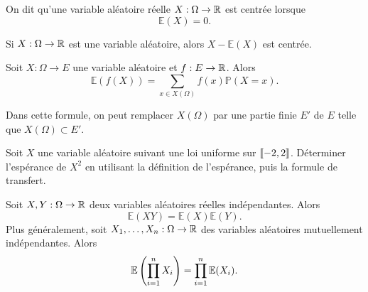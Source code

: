 \documentclass{magnolia}
\begin{document}
\begin{definition}
On dit qu'une variable aléatoire réelle $X:\Omega\to\mathbb{R}$ est centrée lorsque
\[\mathbb{E}(X)=0.\]
\end{definition}

\begin{remarqueUnique}
\remarque Si $X:\Omega\to\mathbb{R}$ est une variable aléatoire, alors $X-\mathbb{E}(X)$ est
  centrée.
\end{remarqueUnique}

\begin{proposition}[nom={Formule de transfert}]
Soit $X:\Omega\to E$ une variable aléatoire et $f:E\to\mathbb{R}$. Alors
\[\mathbb{E}(f(X))=\sum_{x\in X(\Omega)} f(x) \mathbb{P}(X=x).\]
\end{proposition}

\begin{remarqueUnique}
\remarque Dans cette formule, on peut remplacer $X(\Omega)$ par une partie finie $E'$ de $E$ telle que
  $X(\Omega)\subset E'$. 
\end{remarqueUnique}

\begin{exoUnique}
\exo Soit $X$ une variable aléatoire suivant une loi uniforme sur $\left\llbracket -2,2\right\rrbracket$. Déterminer
  l'espérance de $X^2$ en utilisant la définition de l'espérance, puis la formule de
  transfert.
\end{exoUnique}

\begin{proposition}
Soit $X,Y:\Omega\to\mathbb{R}$ deux variables aléatoires réelles indépendantes. Alors
\[\mathbb{E}(XY)=\mathbb{E}(X)\mathbb{E}(Y).\]
Plus généralement, soit $X_1,\ldots,X_n:\Omega\to\mathbb{R}$ des variables aléatoires mutuellement
indépendantes. Alors
\[\mathbb{E}\left(\prod_{i=1}^n X_i\right)=\prod_{i=1}^n \mathbb{E}(X_i).\]
\end{proposition}
\end{document}
